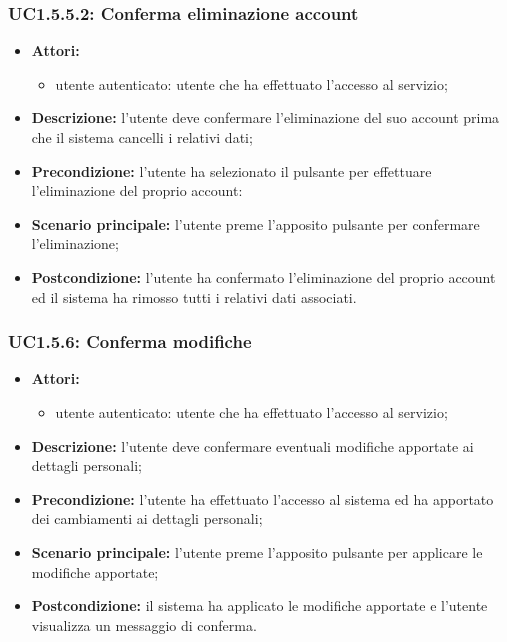 \subsubsection{UC1.5.5.2: Conferma eliminazione account}
\begin{itemize}
	\item \textbf{Attori:}
	\begin{itemize}
		\item utente autenticato: utente che ha effettuato l'accesso al servizio;
	\end{itemize}
	\item \textbf{Descrizione:} l'utente deve confermare l'eliminazione del suo account prima che il sistema cancelli i relativi dati;
	\item \textbf{Precondizione:} l'utente ha selezionato il pulsante per effettuare l'eliminazione del proprio account:
	\item \textbf{Scenario principale:} l'utente preme l'apposito pulsante per confermare l'eliminazione;
	\item \textbf{Postcondizione:} l'utente ha confermato l'eliminazione del proprio account ed il sistema ha rimosso tutti i relativi dati associati.
\end{itemize}

\subsubsection{UC1.5.6:  Conferma modifiche}
\begin{itemize}
	\item \textbf{Attori:}
	\begin{itemize}
		\item utente autenticato: utente che ha effettuato l'accesso al servizio;
	\end{itemize}
	\item \textbf{Descrizione:} l'utente deve confermare eventuali modifiche apportate ai dettagli personali;
	\item \textbf{Precondizione:} l'utente ha effettuato l'accesso al sistema ed ha apportato dei cambiamenti ai dettagli personali;
	\item \textbf{Scenario principale:} l'utente preme l'apposito pulsante per applicare le modifiche apportate;
	\item \textbf{Postcondizione:} il sistema ha applicato le modifiche apportate e l'utente visualizza un messaggio di conferma.
\end{itemize}

